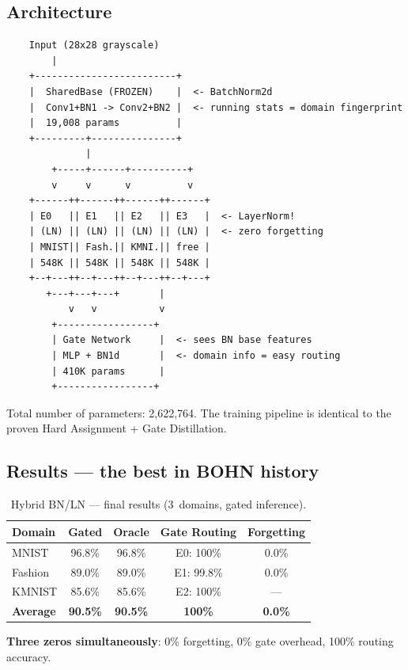 \documentclass[11pt,a4paper]{report}
\begin{document}
\subsection{Architecture}

\begin{verbatim}
    Input (28x28 grayscale)
        |
    +-------------------------+
    |  SharedBase (FROZEN)    |  <- BatchNorm2d
    |  Conv1+BN1 -> Conv2+BN2 |  <- running stats = domain fingerprint
    |  19,008 params          |
    +---------+---------------+
              |
        +-----+------+----------+
        v     v      v          v
    +------++------++------++------+
    | E0   || E1   || E2   || E3   |  <- LayerNorm!
    | (LN) || (LN) || (LN) || (LN) |  <- zero forgetting
    | MNIST|| Fash.|| KMNI.|| free |
    | 548K || 548K || 548K || 548K |
    +--+---++--+---++--+---++--+---+
       +---+---+---+       |
           v   v           v
        +-----------------+
        | Gate Network     |  <- sees BN base features
        | MLP + BN1d       |  <- domain info = easy routing
        | 410K params      |
        +-----------------+
\end{verbatim}

Total number of parameters: 2,622,764. The training pipeline is identical to the proven Hard Assignment + Gate Distillation.

\subsection{Results --- the best in BOHN history}

\begin{table}[h]
\centering
\caption{Hybrid BN/LN --- final results (3~domains, gated inference).}
\begin{tabular}{l c c c c}
\hline
\textbf{Domain} & \textbf{Gated} & \textbf{Oracle} & \textbf{Gate Routing} & \textbf{Forgetting} \\
\hline
MNIST & 96.8\% & 96.8\% & E0: 100\% & 0.0\% \\
Fashion & 89.0\% & 89.0\% & E1: 99.8\% & 0.0\% \\
KMNIST & 85.6\% & 85.6\% & E2: 100\% & --- \\
\textbf{Average} & \textbf{90.5\%} & \textbf{90.5\%} & \textbf{100\%} & \textbf{0.0\%} \\
\hline
\end{tabular}
\end{table}

\textbf{Three zeros simultaneously}: 0\% forgetting, 0\% gate overhead, 100\% routing accuracy.
\end{document}

